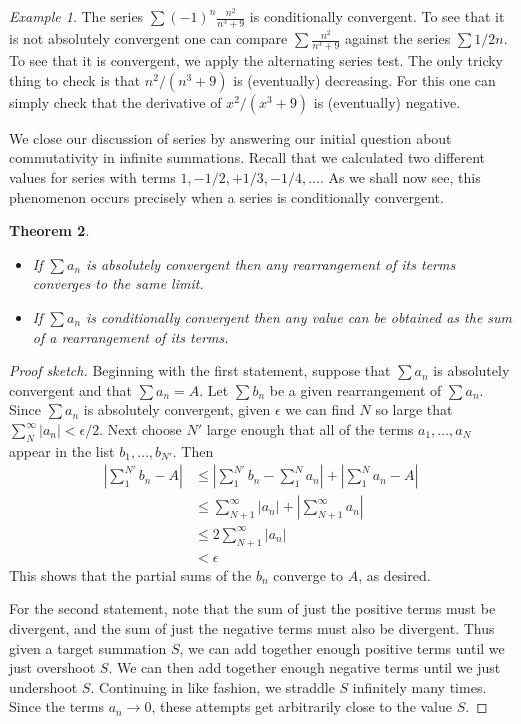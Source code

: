 \documentclass[11pt,oneside]{amsbook}
\theoremstyle{definition}
\theoremstyle{plain}
\newtheorem{theorem}{Theorem}[section]
\theoremstyle{definition}
\theoremstyle{remark}
\newtheorem{example}[theorem]{Example}
\numberwithin{equation}{section}
\numberwithin{figure}{section}
\begin{document}
\begin{example}
  The series $\sum(-1)^n\frac{n^2}{n^3+9}$ is conditionally convergent. To see that it is not absolutely convergent one can compare $\sum\frac{n^2}{n^3+9}$ against the series $\sum 1/2n$. To see that it is convergent, we apply the alternating series test. The only tricky thing to check is that $n^2/(n^3+9)$ is (eventually) decreasing. For this one can simply check that the derivative of $x^2/(x^3+9)$ is (eventually) negative.
\end{example}

We close our discussion of series by answering our initial question about commutativity in infinite summations. Recall that we calculated two different values for series with terms $1,-1/2,+1/3,-1/4,\ldots$. As we shall now see, this phenomenon occurs precisely when a series is conditionally convergent.

\begin{theorem}
  \begin{itemize}
  \item If $\sum a_n$ is absolutely convergent then any rearrangement of its terms converges to the same limit.
  \item If $\sum a_n$ is conditionally convergent then any value can be obtained as the sum of a rearrangement of its terms.
  \end{itemize}
\end{theorem}

\begin{proof}[Proof sketch]
  Beginning with the first statement, suppose that $\sum a_n$ is absolutely convergent and that $\sum a_n=A$. Let $\sum b_n$ be a given rearrangement of $\sum a_n$. Since $\sum a_n$ is absolutely convergent, given $\epsilon$ we can find $N$ so large that $\sum_N^\infty|a_n|<\epsilon/2$. Next choose $N'$ large enough that all of the terms $a_1,\ldots,a_N$ appear in the list $b_1,\ldots,b_{N'}$. Then
  \begin{align*}
    \left|\sum_1^{N'}b_n-A\right|
    &\leq\left|\sum_1^{N'}b_n-\sum_1^Na_n\right|+\left|\sum_1^Na_n-A\right|\\
    &\leq\sum_{N+1}^\infty|a_n|+\left|\sum_{N+1}^\infty a_n\right|\\
    &\leq2\sum_{N+1}^\infty|a_n|\\
    &<\epsilon
  \end{align*}
  This shows that the partial sums of the $b_n$ converge to $A$, as desired.
  
  For the second statement, note that the sum of just the positive terms must be divergent, and the sum of just the negative terms must also be divergent. Thus given a target summation $S$, we can add together enough positive terms until we just overshoot $S$. We can then add together enough negative terms until we just undershoot $S$. Continuing in like fashion, we straddle $S$ infinitely many times. Since the terms $a_n\to0$, these attempts get arbitrarily close to the value $S$.
\end{proof}
\end{document}

